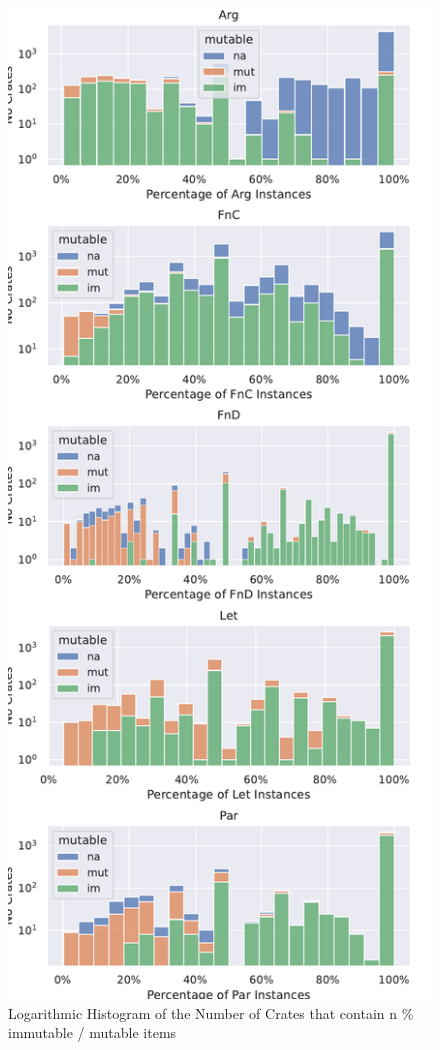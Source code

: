 \documentclass[twoside, english]{sdqthesis}
\theoremstyle{definition}
\begin{document}
\begin{figure}[h]
	\centering
	\includegraphics[width=0.99\linewidth, clip, trim={0.2cm 0.2cm 0.2cm 0.2cm}]{../hist-mutability.pdf}
	\caption{Logarithmic Histogram of the Number of Crates that contain n \% immutable / mutable items}
	\label{fig:mutability-hist}
\end{figure}
\end{document}

